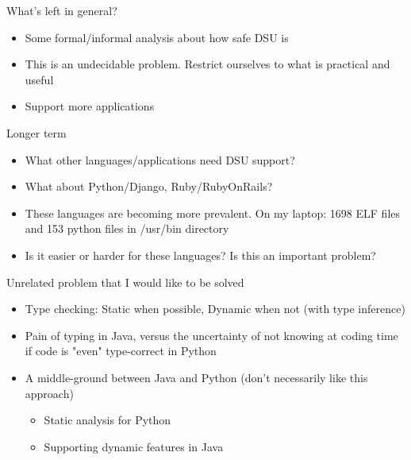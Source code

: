 \documentclass[xcolor=dvipsnames]{beamer}
\begin{document}
\begin{frame}{What's left in general?}%
\begin{itemize}
\item Some formal/informal analysis about how safe DSU is
\item This is an undecidable problem. Restrict ourselves to what is
practical and useful
\item Support more applications
\end{itemize}
\end{frame}

\begin{frame}{Longer term}%
\begin{itemize}
\item What other languages/applications need DSU support?
\item What about Python/Django, Ruby/RubyOnRails?
\item These languages are becoming more prevalent. On my laptop: 1698 ELF
files and 153 python files in /usr/bin directory 
\item Is it easier or harder for these languages? Is this an important
problem?
\end{itemize}
\end{frame}

\begin{frame}{Unrelated problem that I would like to be solved}%
\begin{itemize}
\item Type checking: Static when possible, Dynamic when not (with type
inference)
\item Pain of typing in Java, versus the uncertainty of not knowing at
coding time if code is "even" type-correct in Python
\item A middle-ground between Java and Python (don't necessarily like this
approach)
  \begin{itemize}
  \item Static analysis for Python
  \item Supporting dynamic features in Java
  \end{itemize}
\end{itemize}
\end{frame}
\end{document}
